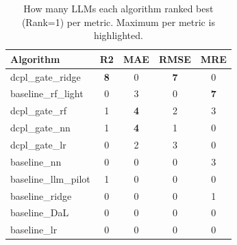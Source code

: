 \begin{table}[t]
\centering
\small
\caption{How many LLMs each algorithm ranked best (Rank=1) per metric. Maximum per metric is highlighted.}
\label{tab:sk_rank1_counts}
\setlength{\tabcolsep}{6pt}
\renewcommand{\arraystretch}{1.15}
\begin{tabular}{lcccc}
\toprule
Algorithm & R2 & MAE & RMSE & MRE \\
\midrule
dcpl\_gate\_ridge & \cellcolor{red!15}\textbf{8} & 0 & \cellcolor{red!15}\textbf{7} & 0 \\
baseline\_rf\_light & 0 & 3 & 0 & \cellcolor{red!15}\textbf{7} \\
dcpl\_gate\_rf & 1 & \cellcolor{red!15}\textbf{4} & 2 & 3 \\
dcpl\_gate\_nn & 1 & \cellcolor{red!15}\textbf{4} & 1 & 0 \\
dcpl\_gate\_lr & 0 & 2 & 3 & 0 \\
baseline\_nn & 0 & 0 & 0 & 3 \\
baseline\_llm\_pilot & 1 & 0 & 0 & 0 \\
baseline\_ridge & 0 & 0 & 0 & 1 \\
baseline\_DaL & 0 & 0 & 0 & 0 \\
baseline\_lr & 0 & 0 & 0 & 0 \\
\bottomrule
\end{tabular}
\end{table}